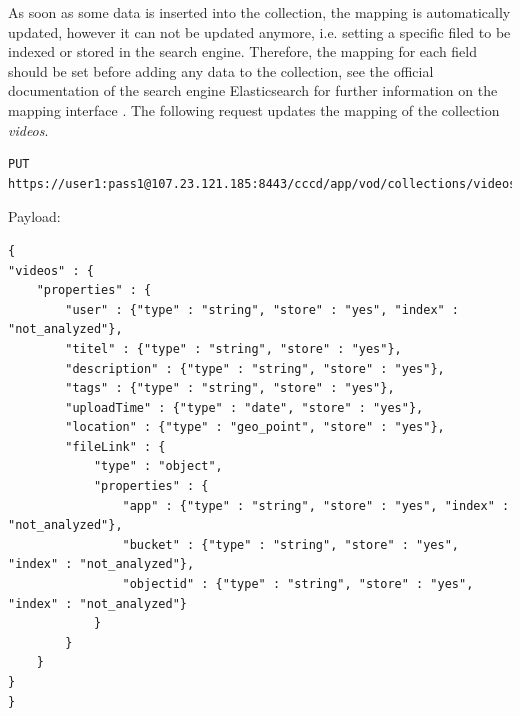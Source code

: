 As soon as some data is inserted into the collection, the mapping is automatically updated, however it can not be updated anymore, i.e. setting a specific filed to be indexed or stored in the search engine. Therefore, the mapping for each field should be set before adding any data to the collection, see the official documentation of the search engine Elasticsearch for further information on the mapping interface \cite{elastic_mapping}. The following request updates the mapping of the collection \textit{videos}.

\begin{code}
\begin{verbatim}
PUT https://user1:pass1@107.23.121.185:8443/cccd/app/vod/collections/videos/mapping
\end{verbatim}
Payload:
\begin{verbatim}
{
"videos" : {
	"properties" : {
		"user" : {"type" : "string", "store" : "yes", "index" : "not_analyzed"},
		"titel" : {"type" : "string", "store" : "yes"},
		"description" : {"type" : "string", "store" : "yes"},
		"tags" : {"type" : "string", "store" : "yes"},
		"uploadTime" : {"type" : "date", "store" : "yes"},
		"location" : {"type" : "geo_point", "store" : "yes"},
		"fileLink" : {
			"type" : "object",
			"properties" : {
				"app" : {"type" : "string", "store" : "yes", "index" : "not_analyzed"},
				"bucket" : {"type" : "string", "store" : "yes", "index" : "not_analyzed"},
				"objectid" : {"type" : "string", "store" : "yes", "index" : "not_analyzed"}
			}
		}
	}
}
}
\end{verbatim}
\end{code}


